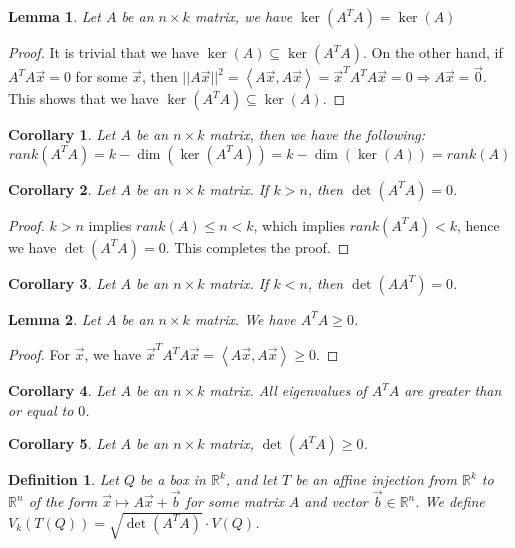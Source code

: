 \documentclass[15pt]{book}
\theoremstyle{break}
\theoremstyle{break}
\newtheorem{lem}{Lemma}[thm]
\newtheorem{corL}{Corollary}[lem]
\newtheorem{defn}{Definition}[corL]
\newcommand{\R}{\mathbb{R}}
\begin{document}
\begin{lem}
Let $A$ be an $n \times k$ matrix, we have $\ker(A^TA) = \ker(A)$
\end{lem}
\begin{proof}
It is trivial that we have $\ker(A) \subseteq \ker(A^TA)$. On the other hand, if $A^TA\vec{x}=0$ for some $\vec{x}$, then $||A\vec{x}||^2=\left<A\vec{x}, A\vec{x}\right>= \vec{x}^TA^TA\vec{x} = 0 \Rightarrow A\vec{x} = \vec{0}$. This shows that we have $\ker(A^TA)\subseteq \ker(A)$.
\end{proof}

\begin{corL}
Let $A$ be an $n \times k$ matrix, then we have the following:
$$rank(A^TA) = k-\dim(\ker(A^TA))=k-\dim(\ker(A)) = rank(A)$$
\end{corL}

\begin{corL}
Let $A$ be an $n \times k$ matrix. If $k>n$, then $\det(A^TA) = 0$. 
\end{corL}
\begin{proof}
$k>n$ implies $rank(A) \leq n <k$, which implies $rank(A^TA)<k$, hence we have $\det(A^TA) = 0$. This completes the proof.
\end{proof}

\begin{corL}
Let $A$ be an $n \times k$ matrix. If $k<n$, then $\det(AA^T) = 0$.
\end{corL}

\begin{lem}
Let $A$ be an $n \times k$ matrix. We have $A^TA\geq 0$.
\end{lem}
\begin{proof}
For $\vec{x}$, we have $\vec{x}^TA^TA\vec{x} = \left<A\vec{x},A\vec{x}\right>\geq 0$.
\end{proof}

\begin{corL}
Let $A$ be an $n \times k$ matrix. All eigenvalues of $A^TA$ are greater than or equal to $0$.
\end{corL}

\begin{corL}
Let $A$ be an $n \times k$ matrix, $\det(A^TA) \geq 0$. 
\end{corL}

\begin{defn}
Let $Q$ be a box in $\R^k$, and let $T$ be an affine injection from $\R^k$ to $\R^n$ of the form $\vec{x}\mapsto A\vec{x}+\vec{b}$ for some matrix $A$ and vector $\vec{b}\in \R^n$. We define $V_k(T(Q)) = \sqrt{\det(A^TA)}\cdot V(Q)$. 
\end{defn}
\end{document}
